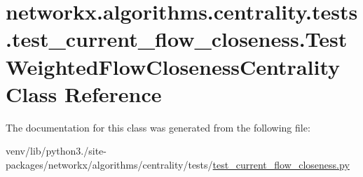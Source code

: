 \hypertarget{classnetworkx_1_1algorithms_1_1centrality_1_1tests_1_1test__current__flow__closeness_1_1TestWeightedFlowClosenessCentrality}{}\section{networkx.\+algorithms.\+centrality.\+tests.\+test\+\_\+current\+\_\+flow\+\_\+closeness.\+Test\+Weighted\+Flow\+Closeness\+Centrality Class Reference}
\label{classnetworkx_1_1algorithms_1_1centrality_1_1tests_1_1test__current__flow__closeness_1_1TestWeightedFlowClosenessCentrality}


The documentation for this class was generated from the following file\+:\begin{DoxyCompactItemize}
\item 
venv/lib/python3./site-\/packages/networkx/algorithms/centrality/tests/\hyperlink{test__current__flow__closeness_8py}{test\+\_\+current\+\_\+flow\+\_\+closeness.\+py}\end{DoxyCompactItemize}
